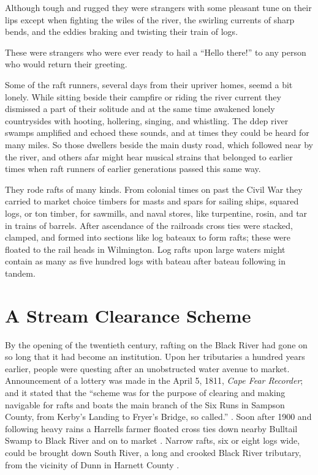 \documentclass[11pt, a5paper]{book}
\begin{document}
Although tough and rugged they were strangers with some pleasant tune
on their lips except when fighting the wiles of the river, the
swirling currents of sharp bends, and the eddies braking and twisting
their train of logs.\par

These were strangers who were ever ready to hail a ``Hello there!'' to
any person who would return their greeting.\par

Some of the raft runners, several days from their upriver homes, seemd
a bit lonely.  While sitting beside their campfire or riding the river
current they dismissed a part of their solitude and at the same time
awakened lonely countrysides with hooting, hollering, singing, and
whistling.  The ddep river swamps amplified and echoed these sounds,
and at times they could be heard for many miles.  So those dwellers
beside the main dusty road, which followed near by the river, and
others afar might hear musical strains that belonged to earlier times
when raft runners of earlier generations passed this same way.\par

They rode rafts of many kinds.  From colonial times on past the Civil
War they carried to market choice timbers for masts and spars for
sailing ships, squared logs, or ton timber, for sawmills, and naval
stores, like turpentine, rosin, and tar in trains of barrels.  After
ascendance of the railroads cross ties were stacked, clamped, and
formed into sections like log bateaux to form rafts; these were
floated to the rail heads in Wilmington.  Log rafts upon large waters
might contain as many as five hundred logs with bateau after bateau
following in tandem.\par

\section*{A Stream Clearance Scheme}

By the opening of the twentieth century, rafting on the Black River
had gone on so long that it had become an institution.  Upon her
tributaries a hundred years earlier, people were questing after an
unobstructed water avenue to market.  Announcement of a lottery was
made in the April 5, 1811, \textit{Cape Fear Recorder}; and it stated
that the ``scheme was for the purpose of clearing and making navigable
for rafts and boats the main branch of the Six Runs in Sampson County,
from Kerby's Landing to Fryer's Bridge, so called.''
\citep[4-5-11]{cfr}.  Soon after 1900 and following heavy rains a
Harrells farmer floated cross ties down nearby Bulltail Swamp to Black
River and on to market \citep[]{melvinew}.  Narrow rafts, six or eight
logs wide, could be brought down South River, a long and crooked Black
River tributary, from the vicinity of Dunn in Harnett County
\citep[]{johnsonlg}.\par
\end{document}
